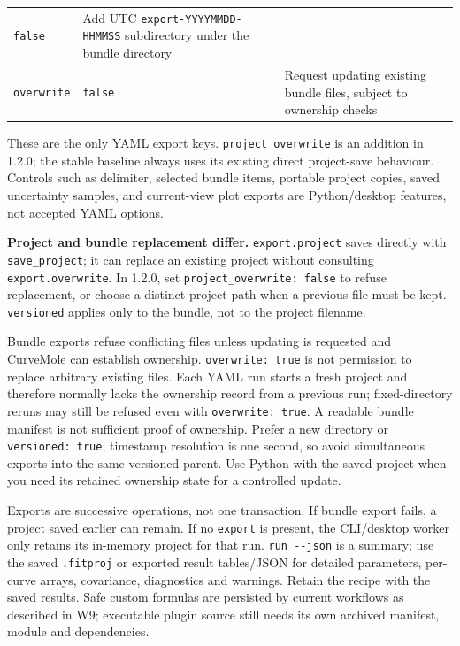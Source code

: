\documentclass[
  10pt,
  a4paper,
  oneside]{scrreprt}
\begin{document}
\begin{longtable}[]{@{}lll@{}}
\begin{minipage}[t]{0.30\columnwidth}
\texttt{false}\strut
\end{minipage} & \begin{minipage}[t]{0.30\columnwidth}\raggedright
Add UTC \texttt{export-YYYYMMDD-HHMMSS} subdirectory under the bundle
directory\strut
\end{minipage}\tabularnewline
\begin{minipage}[t]{0.30\columnwidth}\raggedright
\texttt{overwrite}\strut
\end{minipage} & \begin{minipage}[t]{0.30\columnwidth}\raggedright
\texttt{false}\strut
\end{minipage} & \begin{minipage}[t]{0.30\columnwidth}\raggedright
Request updating existing bundle files, subject to ownership
checks\strut
\end{minipage}\tabularnewline
\bottomrule
\end{longtable}

These are the only YAML export keys. \texttt{project\_overwrite} is an
addition in 1.2.0; the stable baseline always uses its existing direct
project-save behaviour. Controls such as delimiter, selected bundle
items, portable project copies, saved uncertainty samples, and
current-view plot exports are Python/desktop features, not accepted YAML
options.

\textbf{Project and bundle replacement differ.} \texttt{export.project}
saves directly with \texttt{save\_project}; it can replace an existing
project without consulting \texttt{export.overwrite}. In 1.2.0, set
\texttt{project\_overwrite:\ false} to refuse replacement, or choose a
distinct project path when a previous file must be kept.
\texttt{versioned} applies only to the bundle, not to the project
filename.

Bundle exports refuse conflicting files unless updating is requested and
CurveMole can establish ownership. \texttt{overwrite:\ true} is not
permission to replace arbitrary existing files. Each YAML run starts a
fresh project and therefore normally lacks the ownership record from a
previous run; fixed-directory reruns may still be refused even with
\texttt{overwrite:\ true}. A readable bundle manifest is not sufficient
proof of ownership. Prefer a new directory or \texttt{versioned:\ true};
timestamp resolution is one second, so avoid simultaneous exports into
the same versioned parent. Use Python with the saved project when you
need its retained ownership state for a controlled update.

Exports are successive operations, not one transaction. If bundle export
fails, a project saved earlier can remain. If no \texttt{export} is
present, the CLI/desktop worker only retains its in-memory project for
that run. \texttt{run\ -\/-json} is a summary; use the saved
\texttt{.fitproj} or exported result tables/JSON for detailed
parameters, per-curve arrays, covariance, diagnostics and warnings.
Retain the recipe with the saved results. Safe custom formulas are
persisted by current workflows as described in W9; executable plugin
source still needs its own archived manifest, module and dependencies.
\end{document}
